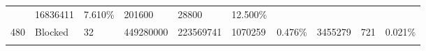 \documentclass[11pt]{article}
\begin{document}
\begin{longtable}[]{@{}llllllllll@{}}
\begin{minipage}[t]{0.06\columnwidth}
\end{minipage} & \begin{minipage}[t]{0.07\columnwidth}\raggedright\strut
16836411\strut
\end{minipage} & \begin{minipage}[t]{0.07\columnwidth}\raggedright\strut
7.610\%\strut
\end{minipage} & \begin{minipage}[t]{0.06\columnwidth}\raggedright\strut
201600\strut
\end{minipage} & \begin{minipage}[t]{0.07\columnwidth}\raggedright\strut
28800\strut
\end{minipage} & \begin{minipage}[t]{0.07\columnwidth}\raggedright\strut
12.500\%\strut
\end{minipage}\tabularnewline
\begin{minipage}[t]{0.09\columnwidth}\raggedright\strut
480\strut
\end{minipage} & \begin{minipage}[t]{0.06\columnwidth}\raggedright\strut
Blocked\strut
\end{minipage} & \begin{minipage}[t]{0.09\columnwidth}\raggedright\strut
32\strut
\end{minipage} & \begin{minipage}[t]{0.07\columnwidth}\raggedright\strut
449280000\strut
\end{minipage} & \begin{minipage}[t]{0.06\columnwidth}\raggedright\strut
223569741\strut
\end{minipage} & \begin{minipage}[t]{0.07\columnwidth}\raggedright\strut
1070259\strut
\end{minipage} & \begin{minipage}[t]{0.07\columnwidth}\raggedright\strut
0.476\%\strut
\end{minipage} & \begin{minipage}[t]{0.06\columnwidth}\raggedright\strut
3455279\strut
\end{minipage} & \begin{minipage}[t]{0.07\columnwidth}\raggedright\strut
721\strut
\end{minipage} & \begin{minipage}[t]{0.07\columnwidth}\raggedright\strut
0.021\%\strut
\end{minipage}\tabularnewline
\begin{minipage}[t]{0.09\columnwidth}\raggedright\strut

\end{minipage}
\end{longtable}
\end{document}

